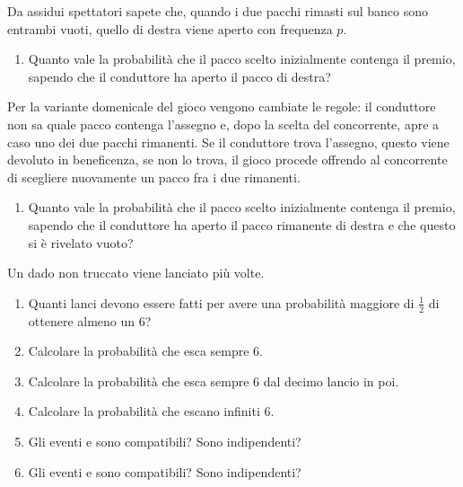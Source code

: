 Da assidui spettatori sapete che, quando i due pacchi rimasti sul banco sono entrambi vuoti, quello di destra viene aperto con frequenza $p$.
\begin{enumerate}
\item Quanto vale la probabilità che il pacco scelto inizialmente contenga il premio, sapendo che il conduttore ha aperto il pacco di destra?
\end{enumerate}

Per la variante domenicale del gioco vengono cambiate le regole: il conduttore non sa quale pacco contenga l'assegno e, dopo la scelta del concorrente, apre a caso uno dei due pacchi rimanenti. Se il conduttore trova l'assegno, questo viene devoluto in beneficenza, se non lo trova, il gioco procede offrendo al concorrente di scegliere nuovamente un pacco fra i due rimanenti.
\begin{enumerate}
\item Quanto vale la probabilità che il pacco scelto inizialmente contenga il premio, sapendo che il conduttore ha aperto il pacco rimanente di destra e che questo si è rivelato vuoto?
\end{enumerate}

Un dado non truccato viene lanciato più volte.
\begin{enumerate}
\item Quanti lanci devono essere fatti per avere una probabilità maggiore di $\frac{1}{2}$ di ottenere almeno un $6$?
\item Calcolare la probabilità che esca sempre $6$.
\item Calcolare la probabilità che esca sempre $6$ dal decimo lancio in poi.
\item Calcolare la probabilità che escano infiniti $6$.
\item Gli eventi  e  sono compatibili? Sono indipendenti?
\item Gli eventi  e  sono compatibili? Sono indipendenti?
\end{enumerate}

